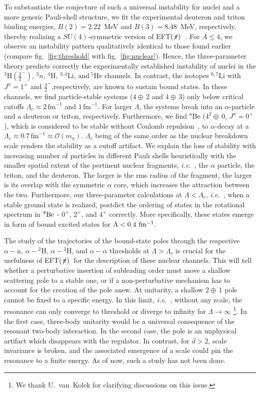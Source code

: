 \documentclass[aps,prl,onecolumn,groupedaddress,superscriptaddress]
{revtex4}
\newcommand{\lc}{\ensuremath{\Lambda_c}}
\newcommand{\fm}{\ensuremath{\,\text{fm}^{-1}}}
\newcommand{\ie}{\textit{i.e.}~}
\newcommand{\eftnopi}{\mbox{EFT$(\not \! \pi)$}}
\newcommand{\figref}[1]{fig.~\ref{#1}}
\begin{document}
To substantiate the conjecture of such a universal instability 
for nuclei and a more generic Pauli-shell structure,
we fit the experimental deuteron and triton binding energies,
$B(2)=2.22$~MeV and \mbox{$B(3)=8.48$}~MeV, respectively, 
thereby realizing a $SU(4)$-symmetric version of \eftnopi~\cite{Konig:2016utl}.
For $A\le 4$, we observe an instability pattern qualitatively identical to
those found earlier (compare \figref{fig:threshold} with \figref{fig:nuclear}).
Hence, the three-parameter theory predicts correctly the experimentally
established instability of nuclei in the
$^3\text{H}(\frac{3}{2}^-),\,^3n,\,^4\text{H},\,^{3,4}\text{Li},\,\text{and}~^5\text{He}$ channels.
In contrast, the isotopes $^{6,7}\text{Li}$ with $J^\pi=1^+$ and $\frac{3}{2}^-$,respectively,
are known to sustain bound states.
In these channels, we find particle-stable systems ($4\oplus\, 2$ and $4\oplus\,3$)
only below critical cutoffs $\lc\approx2\fm$ and $1\fm$.
For larger $\Lambda$, the systems break into an
$\alpha$-particle and a deuteron or triton, respectively.
Furthermore, we find $^8$Be ($4^2\oplus\, 0$, $J^\pi=0^+$), which is considered to be
stable without Coulomb repulsion~\cite{AFZAL:1969zz,Higa:2008dn},
to $\alpha$-decay at a $\lc\approx 0.7\fm\approx\mathcal{O}(m_{\pi})$.
$\lc$ being of the same order as the nuclear breakdown scale renders
the stability as a cutoff artifact.
We explain the loss of stability with increasing number of particles in
different Pauli shells heuristically
with the smaller spatial extent of the pertinent nuclear
fragments, \ie, the $\alpha$ particle, the triton, and the deuteron.
The larger is the rms radius of the fragment, the larger is its overlap with
the symmetric $\alpha$ core, which increases the attraction between the two.
Furthermore, our three-parameter calculations at $\Lambda<\lc$, \ie, when a stable
ground state is realized, postdict the ordering of states in the rotational spectrum
in $\rm ^8Be$ - $0^+$, $2^+$, and $4^+$ correctly. More specifically,
these states emerge in form of bound excited states for $\Lambda<0.4~{\rm fm^{-1}}$.

The study of the trajectories of the
bound-state poles through the respective $\alpha-\text{n}$, $\alpha-{}^2\text{H}$, $\alpha-{}^3\text{H}$, and $\alpha-\alpha$
thresholds at $\Lambda > \lc$
is crucial for the usefulness of \eftnopi~for the
description of these nuclear channels.
This will tell whether a perturbative insertion of subleading
order must move a shallow scattering pole to a stable one, or if
a non-perturbative mechanism has to account for the creation of the
pole anew. 
At unitarity, a shallow $2\oplus\,1$ pole cannot be fixed to a specific energy.
In this limit, \ie, without any scale, the resonance can only converge to threshold
or diverge to infinity for $\Lambda\to\infty$
\footnote{We thank U.~van~Kolck for clarifying discussions on this issue.}.
In the first case, three-body unitarity would be a universal consequence of the resonant two-body
interaction. In the second case, the pole is an unphysical artifact which disappears with the regulator.
In contrast, for $d>2$, scale invariance is broken, and the associated emergence of a
scale could pin the resonance to a finite energy.
As of now, such a study has not been done.
\end{document}
